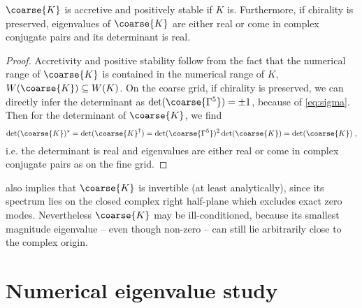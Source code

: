 \begin{lemma} \label{lemma:evals:coarse}
$\coarse{K}$ is accretive and positively stable if $K$ is.
Furthermore, if chirality is preserved, eigenvalues of $\coarse{K}$ are either real or come in complex conjugate pairs and its determinant is real.
\end{lemma}

\begin{proof}
Accretivity and positive stability follow from the fact that the numerical range of $\coarse{K}$ is contained in the numerical range of $K$, $W(\coarse{K}) \subseteq W(K)$.
On the coarse grid, if chirality is preserved, we can directly infer the determinant as $\det(\coarse{\Gamma^{5}}) = \pm 1$, because of \cref{eq:sigma}.
Then for the determinant of $\coarse{K}$, we find
\begin{equation}
\det(\coarse{K})^{\star} =
\det(\coarse{K}^{\dagger}) =
\det(\coarse{\Gamma^{5}})^{2} \det(\coarse{K}) =
\det(\coarse{K}) \;,
\end{equation}
i.e. the determinant is real and eigenvalues are either real or come in complex conjugate pairs as on the fine grid.
\end{proof}

 also implies that $\coarse{K}$ is invertible (at least analytically), since its spectrum lies on the closed complex right half-plane which excludes exact zero modes.
Nevertheless $\coarse{K}$ may be ill-conditioned, because its smallest magnitude eigenvalue -- even though non-zero -- can still lie arbitrarily close to the complex origin.

\section{Numerical eigenvalue study}

